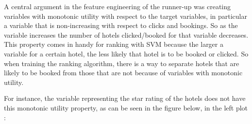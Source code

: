 \documentclass{llncs}
\begin{document}
A central argument in the feature engineering of the runner-up was creating variables with monotonic utility with respect to the target variables, in particular a variable that is non-increasing with respect to clicks and bookings. So as the variable increases the number of hotels clicked/booked for that variable decreases. This property comes in handy for ranking with SVM because the larger a variable for a certain hotel, the less likely that hotel is to be booked or clicked. So when training the ranking algorithm, there is a way to separate hotels that are likely to be booked from those that are not because of variables with monotonic utility.

For instance, the variable representing the star rating of the hotels does not have this monotonic utility property, as can be seen in the figure below, in the left plot :
\end{document}
